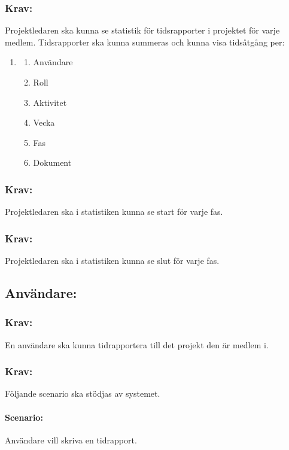 \documentclass[paper=a4, fontsize=11pt,twoside]{article}
\begin{document}
\subsubsection{Krav:}
Projektledaren ska kunna se statistik för tidsrapporter i projektet för varje medlem.
Tidsrapporter ska kunna summeras och kunna visa tidsåtgång per:
\begin{enumerate}
\item[]
\begin{enumerate}
\item Användare
\item Roll
\item Aktivitet
\item Vecka
\item Fas
\item Dokument
	\end{enumerate}
\end{enumerate}
\subsubsection{Krav:}
Projektledaren ska i statistiken kunna se start för varje fas.
\subsubsection{Krav:}
Projektledaren ska i statistiken kunna se slut för varje fas.


\subsection{Användare:}
\subsubsection{Krav:} En användare ska kunna tidrapportera till det projekt den är medlem i.

\subsubsection{Krav:} Följande scenario ska stödjas av systemet.
\paragraph{Scenario:} Användare vill skriva en tidrapport.
\end{document}
